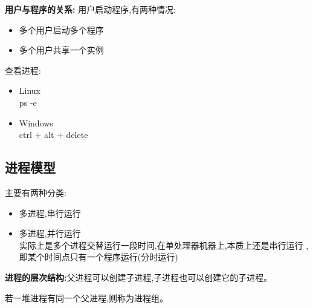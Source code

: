 \documentclass[UTF8,a4paper]{ctexart}
\begin{document}
\textbf{用户与程序的关系:}
用户启动程序,有两种情况:
\begin{itemize}
	\item 多个用户启动多个程序
	\item 多个用户共享一个实例
\end{itemize}


{\color{blue}查看进程:
\begin{itemize}
	\item Linux\\
	      ps -e
	\item Windows\\
	      ctrl + alt + delete
\end{itemize}}

\subsection{进程模型}
主要有两种分类:
\begin{itemize}
	\item 多进程,串行运行
	\item 多进程,并行运行\\
	      实际上是多个进程交替运行一段时间,在单处理器机器上,本质上还是串行运行
	      ,即某个时间点只有一个程序运行(分时运行)
\end{itemize}

\textbf{进程的层次结构:}父进程可以创建子进程,子进程也可以创建它的子进程。

若一堆进程有同一个父进程,则称为进程组。
\end{document}
